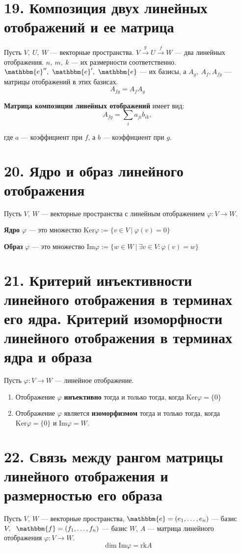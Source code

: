 \documentclass[a4paper, 12pt]{article}
\newcommand{\me}{\mathbbm{e}}
\newcommand{\mf}{\mathbbm{f}}
\begin{document}
\section*{19. Композиция двух линейных отображений и ее матрица}
Пусть $V,\ U,\ W$ --- векторные пространства. $V \xrightarrow{g} U \xrightarrow{f} W$ --- два линейных отображения. $n,\ m,\ k$ --- их размерности соответственно. $\me'',\ \me',\ \me$ --- их базисы, а $A_g,\ A_f, A_{fg}$ --- матрицы отображений в этих базисах.
\[
A_{fg} = A_fA_g
\]

\textbf{Матрица композиции линейных отображений} имеет вид:
\[
A_{fg} = \sum_{i}a_{ji}b_{ik},
\]

где $a$ --- коэффициент при $f$, а $b$ --- коэффициент при $g$.


\section*{20. Ядро и образ линейного отображения}
Пусть $V,\ W$ --- векторные пространства с линейным отображением $\varphi: V \rightarrow W$.

\textbf{Ядро} $\varphi$ --- это множество $\text{Ker}\varphi := \{v \in V\ |\ \varphi(v) = 0\}$

\textbf{Образ} $\varphi$ --- это множество $\text{Im}\varphi := \{w \in W\ |\ \exists v \in V: \varphi(v) = w\}$

\section*{21. Критерий инъективности линейного отображения в терминах его ядра. Критерий изоморфности линейного отображения в терминах ядра и образа}
Пусть $\varphi: V \rightarrow W$ --- линейное отображение.
\vspace{-1mm}
\begin{enumerate}
    \itemsep=0em
    \item Отображение $\varphi$ \textbf{инъективно} тогда и только тогда, когда $\text{Ker}\varphi = \{0\}$
    \item Отображение $\varphi$ является \textbf{изоморфизмом} тогда и только тогда, когда $\text{Ker}\varphi = \{0\}$ и $\text{Im}\varphi = W$.
\end{enumerate}

\section*{22. Связь между рангом матрицы линейного отображения и размерностью его образа}
Пусть $V,\ W$ --- векторные пространства, $\me = (e_1, \ldots, e_n)$ --- базис $V,\ \ \mf = (f_1, \ldots, f_n)$ --- базис $W$, $A$ --- матрица линейного отображения $\varphi: V \rightarrow W$.
\[
\dim \text{Im}\varphi = \text{rk}A
\]
\end{document}

